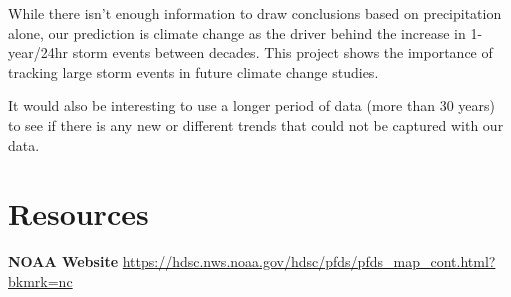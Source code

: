 \documentclass[
  12pt,
]{article}
\begin{document}
While there isn't enough information to draw conclusions based on
precipitation alone, our prediction is climate change as the driver
behind the increase in 1-year/24hr storm events between decades. This
project shows the importance of tracking large storm events in future
climate change studies.

It would also be interesting to use a longer period of data (more than
30 years) to see if there is any new or different trends that could not
be captured with our data.

\newpage

\hypertarget{resources}{%
\section{Resources}\label{resources}}

\textbf{NOAA Website}
\url{https://hdsc.nws.noaa.gov/hdsc/pfds/pfds_map_cont.html?bkmrk=nc}
\end{document}
